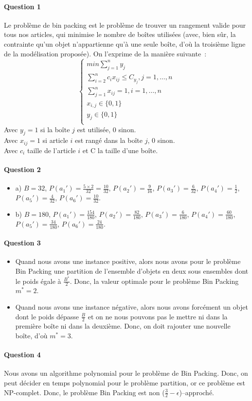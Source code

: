 \paragraph{Question 1}

Le problème de bin packing est le problème de trouver un rangement
valide pour tous nos articles, qui minimise le nombre de boîtes
utilisées (avec, bien sûr, la contrainte qu'un objet n'appartienne
qu'à une seule boîte, d'où la troisième ligne de la modélisation
proposée).  On l'exprime de la manière suivante~:
\begin{equation}
\begin{cases}
min \sum_{j=1}^{n}y_j \\
\sum_{i=2}^{n} c_ix_{ij} \leq C_{y_j}, j = 1, \dots, n \\
\sum_{j=1}^{n}x_{ij}=1, i=1, \dots, n \\
x_{i,j} \in \{ 0,1 \} \\
y_j \in \{ 0,1 \} \\
\end{cases}
\end{equation}
Avec $y_j = 1$ si la boîte $j$ est utilisée, 0 sinon. \\
Avec $x_{ij} = 1 $ si article $i$ est rangé dans la boîte $j$, 0
sinon. \\
Avec $c_i$ taille de l'article $i$ et C la taille d'une boîte.


\paragraph{Question 2}
\begin{itemize}
\item a) $B = 32$, $P(a_1') = \frac{5 \times 2}{32} = \frac{10}{32}$,
  $P(a_2') = \frac{9}{16}$, $P(a_3')=\frac{6}{32}$,
  $P(a_4')=\frac{1}{2}$, $P(a_5')=\frac{4}{32}$, $P(a_6')=\frac{10}{32}$.
\item b) $B = 180$, $P(a_1') = \frac{154}{180}$,
  $P(a_2') = \frac{82}{180}$, $P(a_3')=\frac{6}{180}$,
  $P(a_4')=\frac{60}{180}$, $P(a_5')=\frac{34}{180}$, $P(a_6')=\frac{24}{180}$.
\end{itemize}

\paragraph{Question 3}
\begin{itemize}
\item Quand nous avons une instance positive, alors nous avons pour le problème Bin Packing une partition de l'ensemble d'objets en deux sous ensembles dont le poids égale à $\frac{B^{*}}{2}$. Donc, la valeur optimale pour le problème Bin Packing $m^{*} = 2$. 
\item Quand nous avons une instance négative, alors nous avons forcément un objet dont le poids dépasse $\frac{B}{2}$ et on ne nous pouvons pas le mettre ni dans la première boîte ni dans la deuxième. Donc, on doit rajouter une nouvelle boîte, d'où $m^{*} = 3$.
\end{itemize}
\paragraph{Question 4}
Nous avons un algorithme polynomial pour le problème de Bin Packing. Donc, on peut décider en temps polynomial pour le problème partition, or ce problème est NP-complet. Donc, le problème Bin Packing est non ($\frac{3}{2} - \epsilon $)--approché.


